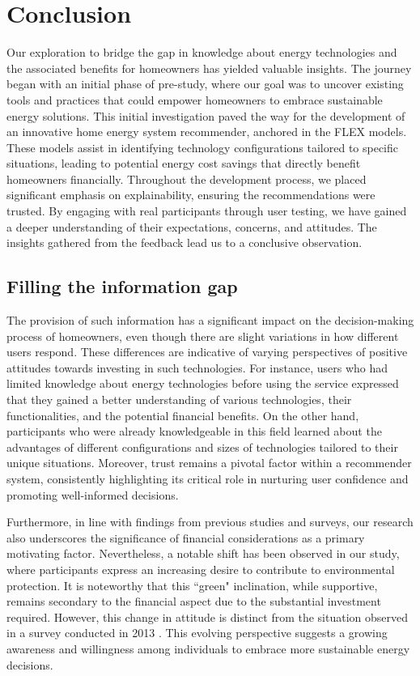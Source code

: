 \chapter{Conclusion}

Our exploration to bridge the gap in knowledge about energy technologies and the associated benefits for homeowners has yielded valuable insights. 
The journey began with an initial phase of pre-study, where our goal was to uncover existing tools and practices that could empower homeowners to embrace sustainable energy solutions. 
This initial investigation paved the way for the development of an innovative home energy system recommender, anchored in the FLEX models. 
These models assist in identifying technology configurations tailored to specific situations, leading to potential energy cost savings that directly benefit homeowners financially. 
Throughout the development process, we placed significant emphasis on explainability, ensuring the recommendations were trusted.  
By engaging with real participants through user testing, we have gained a deeper understanding of their expectations, concerns, and attitudes. 
The insights gathered from the feedback lead us to a conclusive observation.


\section{Filling the information gap}

The provision of such information has a significant impact on the decision-making process of homeowners, even though there are slight variations in how different users respond. 
These differences are indicative of varying perspectives of positive attitudes towards investing in such technologies. 
For instance, users who had limited knowledge about energy technologies before using the service expressed that they gained a better understanding of various technologies, their functionalities, and the potential financial benefits.
On the other hand, participants who were already knowledgeable in this field learned about the advantages of different configurations and sizes of technologies tailored to their unique situations.
Moreover, trust remains a pivotal factor within a recommender system, consistently highlighting its critical role in nurturing user confidence and promoting well-informed decisions.

Furthermore, in line with findings from previous studies and surveys, our research also underscores the significance of financial considerations as a primary motivating factor. 
Nevertheless, a notable shift has been observed in our study, where participants express an increasing desire to contribute to environmental protection.
It is noteworthy that this ``green" inclination, while supportive, remains secondary to the financial aspect due to the substantial investment required. 
However, this change in attitude is distinct from the situation observed in a survey conducted in 2013 \cite{informationgap}. 
This evolving perspective suggests a growing awareness and willingness among individuals to embrace more sustainable energy decisions.

